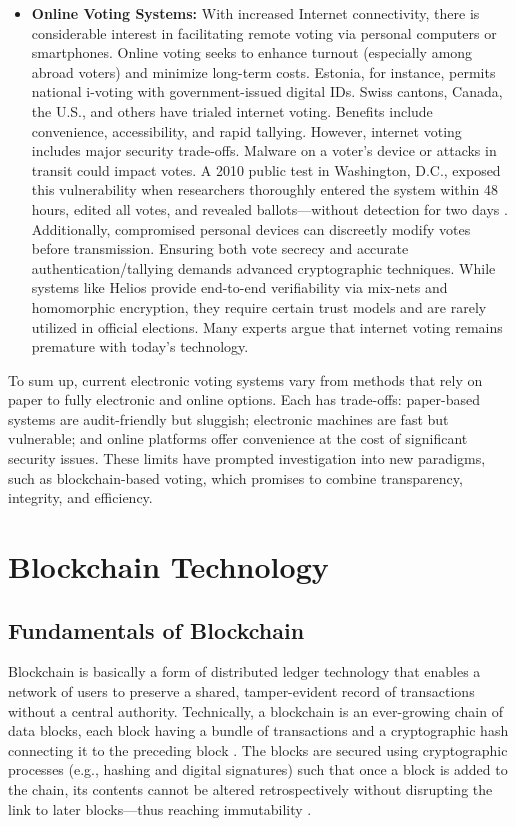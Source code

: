 \documentclass[a4paper,10pt]{report}
\begin{document}
\begin{itemize}
      \item \textbf  {Online Voting Systems:}   With increased Internet connectivity, there is considerable interest in facilitating remote voting via personal computers or smartphones.   Online voting seeks to enhance turnout (especially among abroad voters) and minimize long-term costs.   Estonia, for instance, permits national i-voting with government-issued digital IDs.   Swiss cantons, Canada, the U.S., and others have trialed internet voting.   Benefits include convenience, accessibility, and rapid tallying.   However, internet voting includes major security trade-offs.   Malware on a voter's device or attacks in transit could impact votes.   A 2010 public test in Washington, D.C., exposed this vulnerability when researchers thoroughly entered the system within 48 hours, edited all votes, and revealed ballots—without detection for two days \cite{springer2010}.   Additionally, compromised personal devices can discreetly modify votes before transmission.   Ensuring both vote secrecy and accurate authentication/tallying demands advanced cryptographic techniques.   While systems like Helios provide end-to-end verifiability via mix-nets and homomorphic encryption, they require certain trust models and are rarely utilized in official elections.   Many experts argue that internet voting remains premature with today’s technology.
  \end{itemize}

  To sum up, current electronic voting systems vary from methods that rely on paper to fully electronic and online options.   Each has trade-offs: paper-based systems are audit-friendly but sluggish; electronic machines are fast but vulnerable; and online platforms offer convenience at the cost of significant security issues.   These limits have prompted investigation into new paradigms, such as blockchain-based voting, which promises to combine transparency, integrity, and efficiency.

\section{Blockchain Technology}

\subsection{Fundamentals of Blockchain}

Blockchain is basically a form of distributed ledger technology that enables a network of users to preserve a shared, tamper-evident record of transactions without a central authority.   Technically, a blockchain is an ever-growing chain of data blocks, each block having a bundle of transactions and a cryptographic hash connecting it to the preceding block \cite{pmc2020}.   The blocks are secured using cryptographic processes (e.g., hashing and digital signatures) such that once a block is added to the chain, its contents cannot be altered retrospectively without disrupting the link to later blocks—thus reaching immutability \cite{mdpi2020}.
\end{document}
